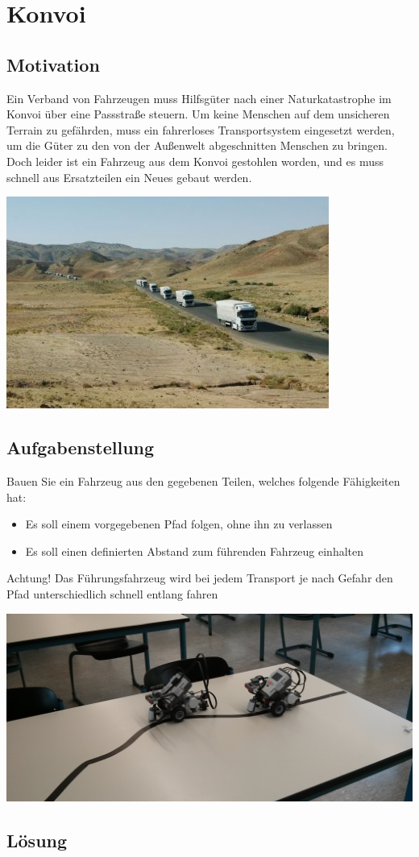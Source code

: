 \chapter{Konvoi}
\section{Motivation}
Ein Verband von Fahrzeugen muss Hilfsgüter nach einer Naturkatastrophe im Konvoi über
eine Passstraße steuern. Um keine Menschen auf dem unsicheren Terrain zu gefährden, muss
ein fahrerloses Transportsystem eingesetzt werden, um die Güter zu den von der Außenwelt
abgeschnitten Menschen zu bringen. Doch leider ist ein Fahrzeug aus dem Konvoi gestohlen
worden, und es muss schnell aus Ersatzteilen ein Neues gebaut werden.

\begin{capfigure}[Konvoi]
	\includegraphics[width=\textwidth]{images/konvoi}
\end{capfigure}

\section{Aufgabenstellung}
Bauen Sie ein Fahrzeug aus den gegebenen Teilen, welches folgende Fähigkeiten hat:
\begin{itemize}
	\item Es soll einem vorgegebenen Pfad folgen, ohne ihn zu verlassen
	\item Es soll einen definierten Abstand zum führenden Fahrzeug einhalten
\end{itemize}

Achtung! Das Führungsfahrzeug wird bei jedem Transport je nach Gefahr den Pfad unterschiedlich
schnell entlang fahren

\begin{capfigure}[Strecke]
	\includegraphics[width=\textwidth]{images/fotokonvoi}
\end{capfigure}
\section{Lösung}